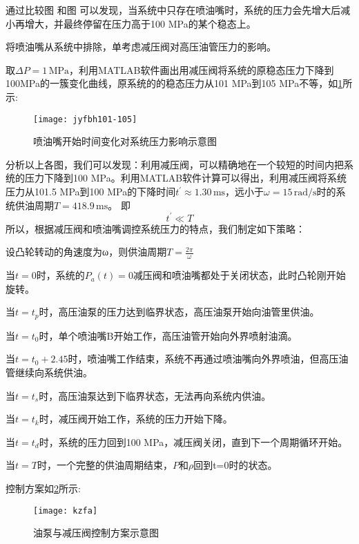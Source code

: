 \documentclass[withoutpreface,bwprint]{cumcmthesis} %
\begin{document}
通过比较图 和图 可以发现，当系统中只存在喷油嘴时，系统的压力会先增大后减小再增大，并最终停留在压力高于100 MPa的某个稳态上。

将喷油嘴从系统中排除，单考虑减压阀对高压油管压力的影响。

取$\Delta P=1\,\text{MPa}$，利用MATLAB软件画出用减压阀将系统的原稳态压力下降到100MPa的一簇变化曲线，原系统的的稳态压力从101 MPa到105 MPa不等，如\cref{fig:jyfbh101-105}所示:


\begin{figure}[!h]
	\centering
	\texttt{[image: jyfbh101-105]}
	\caption{喷油嘴开始时间变化对系统压力影响示意图}
	\label{fig:jyfbh101-105}
\end{figure}


分析以上各图，我们可以发现：利用减压阀，可以精确地在一个较短的时间内把系统的压力下降到100 MPa。利用MATLAB软件计算可以得出，利用减压阀将系统压力从101.5 MPa到100 MPa的下降时间$t^{'}\approx 1.30\,\text{ms}$，远小于$\omega=15\,\text{rad/s}$时的系统供油周期$T=418.9\,\text{ms}$。
即
\begin{equation}
t^{'}\ll  T
\end{equation}
所以，根据减压阀和喷油嘴调控系统压力的特点，我们制定如下策略：

设凸轮转动的角速度为ω，则供油周期$T=\frac{2 \pi}{ \omega}$

当$t=0$时，系统的$P_{a}(t)=0$减压阀和喷油嘴都处于关闭状态，此时凸轮刚开始旋转。

当$t=t_{p}$时，高压油泵的压力达到临界状态，高压油泵开始向油管里供油。

当$t=t_{0}$时，单个喷油嘴B开始工作，高压油管开始向外界喷射油滴。

当$t=t_{0}+2.45$时，喷油嘴工作结束，系统不再通过喷油嘴向外界喷油，但高压油管继续向系统供油。 

当$t=t_{s}$时，高压油泵达到下临界状态，无法再向系统内供油。

当$t=t_{k}$时，减压阀开始工作，系统的压力开始下降。

当$t=t_{d}$时，系统的压力回到100 MPa，减压阀关闭，直到下一个周期循环开始。

当$t=T$时，一个完整的供油周期结束，$P$和$\rho$回到t=0时的状态。

控制方案如\cref{fig:kzfa}所示:

\begin{figure}[!h]
	\centering
	\texttt{[image: kzfa]}
	\caption{油泵与减压阀控制方案示意图}
	\label{fig:kzfa}
\end{figure}
\end{document}
